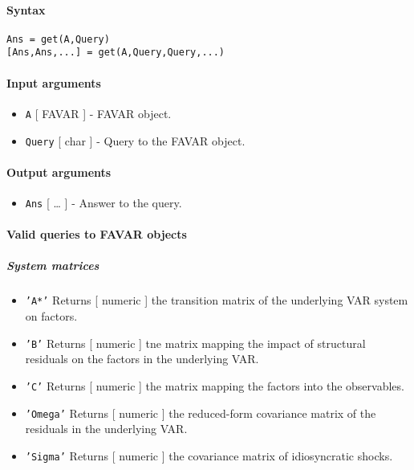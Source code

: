 


	\paragraph{Syntax}

\begin{verbatim}
Ans = get(A,Query)
[Ans,Ans,...] = get(A,Query,Query,...)
\end{verbatim}

\paragraph{Input arguments}

\begin{itemize}
\item
  \texttt{A} {[} FAVAR {]} - FAVAR object.
\item
  \texttt{Query} {[} char {]} - Query to the FAVAR object.
\end{itemize}

\paragraph{Output arguments}

\begin{itemize}
\itemsep1pt\parskip0pt
\item
  \texttt{Ans} {[} \ldots{} {]} - Answer to the query.
\end{itemize}

\paragraph{Valid queries to FAVAR
objects}

\subparagraph{System matrices}

\begin{itemize}
\item
  \texttt{'A*'} Returns {[} numeric {]} the transition matrix of the
  underlying VAR system on factors.
\item
  \texttt{'B'} Returns {[} numeric {]} tne matrix mapping the impact of
  structural residuals on the factors in the underlying VAR.
\item
  \texttt{'C'} Returns {[} numeric {]} the matrix mapping the factors
  into the observables.
\item
  \texttt{'Omega'} Returns {[} numeric {]} the reduced-form covariance
  matrix of the residuals in the underlying VAR.
\item
  \texttt{'Sigma'} Returns {[} numeric {]} the covariance matrix of
  idiosyncratic shocks.
\end{itemize}


